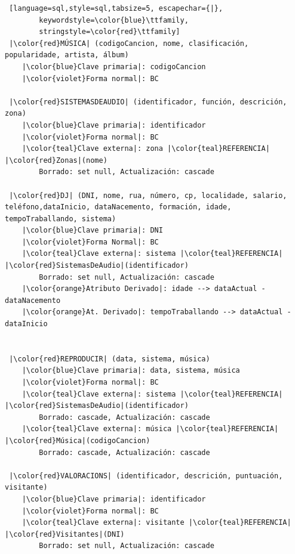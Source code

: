 \documentclass[12pt,a4paper]{book}
\theoremstyle{definition}
\theoremstyle{break}
\begin{document}
\begin{lstlisting} [language=sql,style=sql,tabsize=5, escapechar={|},
		keywordstyle=\color{blue}\ttfamily,
		stringstyle=\color{red}\ttfamily]
 |\color{red}MÚSICA| (codigoCancion, nome, clasificación, popularidade, artista, álbum)
	|\color{blue}Clave primaria|: codigoCancion
	|\color{violet}Forma normal|: BC
		
 |\color{red}SISTEMASDEAUDIO| (identificador, función, descrición, zona)
	|\color{blue}Clave primaria|: identificador
	|\color{violet}Forma normal|: BC
	|\color{teal}Clave externa|: zona |\color{teal}REFERENCIA| |\color{red}Zonas|(nome)
		Borrado: set null, Actualización: cascade
		
 |\color{red}DJ| (DNI, nome, rua, número, cp, localidade, salario, teléfono,dataInicio, dataNacemento, formación, idade, tempoTraballando, sistema)
	|\color{blue}Clave primaria|: DNI
	|\color{violet}Forma Normal|: BC
	|\color{teal}Clave externa|: sistema |\color{teal}REFERENCIA| |\color{red}SistemasDeAudio|(identificador)
		Borrado: set null, Actualización: cascade
	|\color{orange}Atributo Derivado|: idade --> dataActual - dataNacemento
	|\color{orange}At. Derivado|: tempoTraballando --> dataActual - dataInicio
		
		
 |\color{red}REPRODUCIR| (data, sistema, música)
	|\color{blue}Clave primaria|: data, sistema, música
	|\color{violet}Forma normal|: BC
	|\color{teal}Clave externa|: sistema |\color{teal}REFERENCIA| |\color{red}SistemasDeAudio|(identificador)
		Borrado: cascade, Actualización: cascade
	|\color{teal}Clave externa|: música |\color{teal}REFERENCIA| |\color{red}Música|(codigoCancion)
		Borrado: cascade, Actualización: cascade
		
 |\color{red}VALORACIONS| (identificador, descrición, puntuación, visitante)
	|\color{blue}Clave primaria|: identificador
	|\color{violet}Forma normal|: BC
	|\color{teal}Clave externa|: visitante |\color{teal}REFERENCIA| |\color{red}Visitantes|(DNI)
		Borrado: set null, Actualización: cascade

	\end{lstlisting}
\end{document}

